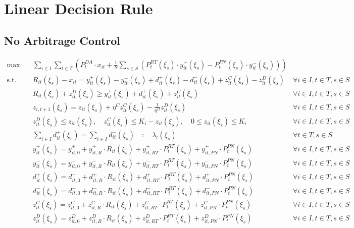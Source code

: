 \documentclass[10pt]{article}
\begin{document}
\newpage
\section{Linear Decision Rule}

\subsection{No Arbitrage Control}
\begin{subequations}
    \begin{align}
        \text{max} \quad &\sum_{i\in I}\sum_{t\in T}\left(P_t^{DA} \cdot x_{it} + \frac{1}{S}\sum_{s \in S}\left(P_t^{RT}(\xi_s) \cdot y^+_{it}(\xi_s) - P_t^{PN}(\xi_s) \cdot y^-_{it}(\xi_s)\right) \right) \\   
        \text{s.t.} \quad 
        & R_{it}(\xi_s) - x_{it} = y_{it}^{+}(\xi_s) - y_{it}^{-}(\xi_s) + d^+_{it}(\xi_s) - d^-_{it}(\xi_s) + z^C_{it}(\xi_s) - z^D_{it}(\xi_s) & \forall i \in I, t \in T, s \in S \\
        & R_{it}(\xi_s) + z^D_{it}(\xi_s) \geq y^+_{it}(\xi_s) + d^+_{it}(\xi_s) + z^C_{it}(\xi_s) & \forall i \in I, t \in T, s \in S \\
        & z_{i,t+1}(\xi_s) = z_{it}(\xi_s) + \eta^C z^C_{it}(\xi_s) - \frac{1}{\eta^D} z^D_{it}(\xi_s) & \forall i \in I, t \in T, s \in S \\
        & z^D_{it}(\xi_s) \le z_{it}(\xi_s), \quad z^C_{it}(\xi_s) \le K_i - z_{it}(\xi_s), \quad 0 \leq z_{it}(\xi_s) \leq K_i & \forall i \in I, t \in T, s \in S \\
        & \sum_{i \in I} d^+_{it}(\xi_s) = \sum_{i \in I} d^-_{it}(\xi_s) \quad : \quad \lambda_t(\xi_s) & \forall t \in T, s \in S \\
        & y^+_{it}(\xi_s) = y^+_{it,0} + y^+_{it,R} \cdot R_{it}(\xi_s) + y^+_{it,RT} \cdot P^{RT}_t(\xi_s) + y^+_{it,PN} \cdot P^{PN}_t(\xi_s) & \forall i \in I, t \in T, s \in S \\
        & y^-_{it}(\xi_s) = y^-_{it,0} + y^-_{it,R} \cdot R_{it}(\xi_s) + y^-_{it,RT} \cdot P^{RT}_t(\xi_s) + y^-_{it,PN} \cdot P^{PN}_t(\xi_s) & \forall i \in I, t \in T, s \in S \\
        & d^+_{it}(\xi_s) = d^+_{it,0} + d^+_{it,R} \cdot R_{it}(\xi_s) + d^+_{it,RT} \cdot P^{RT}_t(\xi_s) + d^+_{it,PN} \cdot P^{PN}_t(\xi_s) & \forall i \in I, t \in T, s \in S \\
        & d^-_{it}(\xi_s) = d^-_{it,0} + d^-_{it,R} \cdot R_{it}(\xi_s) + d^-_{it,RT} \cdot P^{RT}_t(\xi_s) + d^-_{it,PN} \cdot P^{PN}_t(\xi_s) & \forall i \in I, t \in T, s \in S \\
        & z^C_{it}(\xi_s) = z^C_{it,0} + z^C_{it,R} \cdot R_{it}(\xi_s) + z^C_{it,RT} \cdot P^{RT}_t(\xi_s) + z^C_{it,PN} \cdot P^{PN}_t(\xi_s) & \forall i \in I, t \in T, s \in S \\
        & z^D_{it}(\xi_s) = z^D_{it,0} + z^D_{it,R} \cdot R_{it}(\xi_s) + z^D_{it,RT} \cdot P^{RT}_t(\xi_s) + z^D_{it,PN} \cdot P^{PN}_t(\xi_s) & \forall i \in I, t \in T, s \in S
    \end{align}
\end{subequations}
\end{document}
